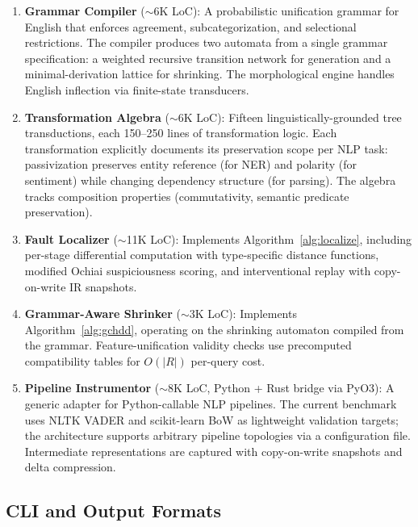 \documentclass[sigconf,nonacm]{acmart}
\begin{document}
\begin{enumerate}
    \item \textbf{Grammar Compiler} (${\sim}$6K LoC): A probabilistic unification grammar for English that enforces agreement, subcategorization, and selectional restrictions.
    The compiler produces two automata from a single grammar specification: a weighted recursive transition network for generation and a minimal-derivation lattice for shrinking.
    The morphological engine handles English inflection via finite-state transducers.

    \item \textbf{Transformation Algebra} (${\sim}$6K LoC): Fifteen linguistically-grounded tree transductions, each 150--250 lines of transformation logic.
    Each transformation explicitly documents its preservation scope per NLP task: passivization preserves entity reference (for NER) and polarity (for sentiment) while changing dependency structure (for parsing).
    The algebra tracks composition properties (commutativity, semantic predicate preservation).

    \item \textbf{Fault Localizer} (${\sim}$11K LoC): Implements Algorithm~\ref{alg:localize}, including per-stage differential computation with type-specific distance functions, modified Ochiai suspiciousness scoring, and interventional replay with copy-on-write IR snapshots.

    \item \textbf{Grammar-Aware Shrinker} (${\sim}$3K LoC): Implements Algorithm~\ref{alg:gchdd}, operating on the shrinking automaton compiled from the grammar.
    Feature-unification validity checks use precomputed compatibility tables for $O(|R|)$ per-query cost.

    \item \textbf{Pipeline Instrumentor} (${\sim}$8K LoC, Python + Rust bridge via PyO3): A generic adapter for Python-callable NLP pipelines.
    The current benchmark uses NLTK VADER and scikit-learn BoW as lightweight validation targets; the architecture supports arbitrary pipeline topologies via a configuration file.
    Intermediate representations are captured with copy-on-write snapshots and delta compression.
\end{enumerate}

\subsection{CLI and Output Formats}
\end{document}
